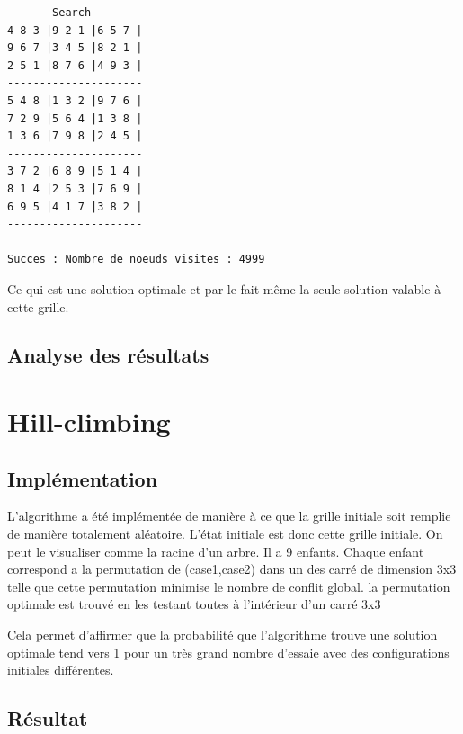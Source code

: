 \documentclass[a4paper,10pt]{article}
\begin{document}
\begin{verbatim}
   --- Search ---
4 8 3 |9 2 1 |6 5 7 |
9 6 7 |3 4 5 |8 2 1 |
2 5 1 |8 7 6 |4 9 3 |
---------------------
5 4 8 |1 3 2 |9 7 6 |
7 2 9 |5 6 4 |1 3 8 |
1 3 6 |7 9 8 |2 4 5 |
---------------------
3 7 2 |6 8 9 |5 1 4 |
8 1 4 |2 5 3 |7 6 9 |
6 9 5 |4 1 7 |3 8 2 |
---------------------

Succes : Nombre de noeuds visites : 4999
\end{verbatim}

Ce qui est une solution optimale et par le fait même la seule solution valable à cette grille.


\subsection{Analyse des résultats}

\section{Hill-climbing}

\subsection{Implémentation}
L'algorithme a été implémentée de manière à ce que la grille initiale soit remplie de manière totalement aléatoire. L'état initiale est donc cette grille initiale. On peut le visualiser comme la racine d'un arbre. Il a 9 enfants. Chaque enfant correspond a la permutation de (case1,case2) dans un des carré de dimension 3x3 telle que cette permutation minimise le nombre de conflit global. la permutation optimale est trouvé en les testant toutes à l'intérieur d'un carré 3x3


Cela permet d'affirmer que la probabilité que l'algorithme trouve une solution optimale tend vers 1 pour un très grand nombre d'essaie avec des configurations initiales différentes.

\subsection{Résultat}
\end{document}

